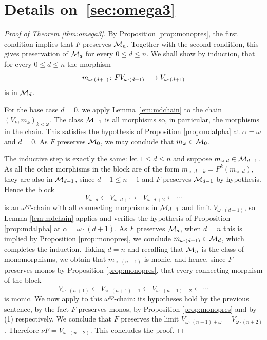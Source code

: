 \documentclass[runningheads]{llncs}
\begin{document}
\section{Details on~\cref{sec:omega3}}
\printProofs[omega3]
\begin{proof}[Proof of Theorem \ref{thm:omega3}]
By Proposition \ref{prop:monopres}, the first condition implies that $F$ preserves $\mathcal{M}_n$.
Together with the second condition, this gives preservation of $\mathcal{M}_d$ for every $0 \leq d \leq n$.
We shall show by induction, that for every $0\leq d\leq n$ the morphism
\begin{equation*}
m_{\omega\cdot (d+1)}\colon FV_{\omega\cdot (d+1)} \longrightarrow V_{\omega\cdot(d+1)}
\end{equation*}
is in $\mathcal{M}_d$.

For the base case $d = 0$,  we apply Lemma \ref{lem:mdchain} to the chain $(V_k, m_k)_{k<\omega}$. 
The class $\mathcal{M}_{-1}$ is all morphisms so, in particular, the morphisms in the chain. This satisfies the hypothesis of Proposition \ref{prop:mdalpha} at $\alpha = \omega$ and $d = 0$.
 As $F$ preserves $\mathcal{M}_0$, we may conclude that $m_\omega \in \mathcal{M}_0$.

The inductive step is exactly the same: let $1 \leq d \leq n$ and suppose $m_{\omega\cdot d} \in \mathcal{M}_{d-1}$. 
As all the other morphisms in the block are of the form $m_{\omega\cdot d + k} = F^k(m_{\omega\cdot d})$, they are also in $\mathcal{M}_{d-1}$, since $d-1\leq n-1$ and $F$ preserves $\mathcal{M}_{d-1}$ by hypothesis.
 Hence the block
\begin{equation*}
V_{\omega\cdot d} \longleftarrow V_{\omega\cdot d + 1}\longleftarrow V_{\omega\cdot d + 2}\longleftarrow \cdots
\end{equation*}
is an $\omega^{op}$-chain with all connecting morphisms in $\mathcal{M}_{d-1}$ and limit $V_{\omega\cdot(d+1)}$, so Lemma \ref{lem:mdchain} applies and verifies the hypothesis of Proposition \ref{prop:mdalpha} at $\alpha = \omega\cdot (d+1)$.
 As $F$ preserves $\mathcal{M}_d$, when $d= n$ this is implied by Proposition \ref{prop:monopres}, we conclude $m_{\omega\cdot(d+1)} \in \mathcal{M}_d$, which completes the induction.
Taking $d = n$ and recalling that $\mathcal{M}_n$ is the class of monomorphisms, we obtain that $m_{\omega\cdot(n+1)}$ is monic, and hence, since  $F$ preserves monos by Proposition \ref{prop:monopres}, that every connecting morphism of the block
\begin{equation*}
V_{\omega\cdot(n+1)} \longleftarrow V_{\omega\cdot(n+1) + 1}\longleftarrow V_{\omega\cdot(n+1) + 2}\longleftarrow \cdots
\end{equation*}
is monic. 
We now apply \cite[Proposition 3.1]{AdamekEA25} to this $\omega^{op}$-chain: its hypotheses hold by the previous sentence, by the fact $F$ preserves monos, by Proposition \ref{prop:monopres} and by (1) respectively. 
We conclude that $F$ preserves the limit $V_{\omega\cdot(n+1)+\omega} = V_{\omega\cdot(n+2)}$.
Therefore $\nu F = V_{\omega\cdot(n+2)}$. This concludes the proof.
\end{proof}
\end{document}
